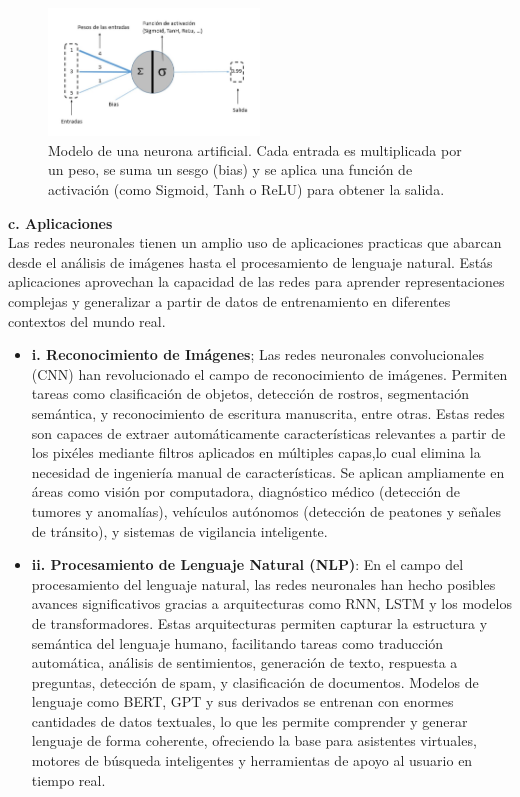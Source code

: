 \documentclass[11pt]{article} %
\begin{document}
\begin{figure}[H]
    \centering
    \includegraphics[width=0.5\textwidth]{Images/111-1.jpg}
    \caption{Modelo de una neurona artificial. Cada entrada es multiplicada por un peso, se suma un sesgo (bias) y se aplica una función de activación (como Sigmoid, Tanh o ReLU) para obtener la salida.}
    \label{fig:neurona-artificial}
\end{figure}
\textbf{c. Aplicaciones} \\[3pt]
Las redes neuronales tienen un amplio uso de aplicaciones practicas que abarcan desde el análisis de imágenes hasta el procesamiento de lenguaje natural. Estás aplicaciones aprovechan la capacidad de las redes para aprender representaciones complejas y generalizar a partir de datos de entrenamiento en diferentes contextos del mundo real.
\begin{itemize}
    \item \textbf{i. Reconocimiento de Imágenes}; \newline
    Las redes neuronales convolucionales (CNN) han revolucionado el campo de reconocimiento de imágenes. Permiten tareas como clasificación de objetos, detección de rostros, segmentación semántica, y reconocimiento de escritura manuscrita, entre otras. Estas redes son capaces de extraer automáticamente características relevantes a partir de los pixéles mediante filtros aplicados en múltiples capas,lo cual elimina la necesidad de ingeniería manual de características. Se aplican ampliamente en áreas como visión por computadora, diagnóstico médico (detección de tumores y anomalías), vehículos autónomos (detección de peatones y señales de tránsito), y sistemas de vigilancia inteligente.
    \item \textbf{ii. Procesamiento de Lenguaje Natural (NLP)}: \newline
    En el campo del procesamiento del lenguaje natural, las redes neuronales han hecho posibles avances significativos gracias a arquitecturas como RNN, LSTM y los modelos de transformadores. Estas arquitecturas permiten capturar la estructura y semántica del lenguaje humano, facilitando tareas como traducción automática, análisis de sentimientos, generación de texto, respuesta a preguntas, detección de spam, y clasificación de documentos. Modelos de lenguaje como BERT, GPT y sus derivados se entrenan con enormes cantidades de datos textuales, lo que les permite comprender y generar lenguaje de forma coherente, ofreciendo la base para asistentes virtuales, motores de búsqueda inteligentes y herramientas de apoyo al usuario en tiempo real.

\end{itemize}
\end{document}
